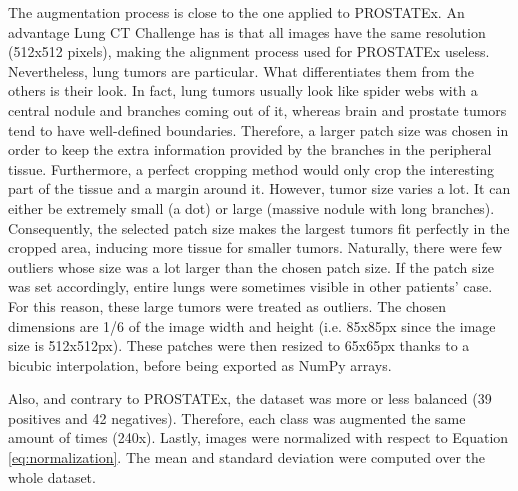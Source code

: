 The augmentation process is close to the one applied to PROSTATEx. An advantage Lung CT Challenge has is that all images have the same resolution (512x512 pixels), making the alignment process used for PROSTATEx useless. Nevertheless, lung tumors are particular. What differentiates them from the others is their look. In fact, lung tumors usually look like spider webs with a central nodule and branches coming out of it, whereas brain and prostate tumors tend to have well-defined boundaries. Therefore, a larger patch size was chosen in order to keep the extra information provided by the branches in the peripheral tissue. Furthermore, a perfect cropping method would only crop the interesting part of the tissue and a margin around it. However, tumor size varies a lot. It can either be extremely small (a dot) or large (massive nodule with long branches). Consequently, the selected patch size makes the largest tumors fit perfectly in the cropped area, inducing more tissue for smaller tumors. Naturally, there were few outliers whose size was a lot larger than the chosen patch size. If the patch size was set accordingly, entire lungs were sometimes visible in other patients' case. For this reason, these large tumors were treated as outliers. The chosen dimensions are 1/6 of the image width and height (i.e. 85x85px since the image size is 512x512px). These patches were then resized to 65x65px thanks to a bicubic interpolation, before being exported as NumPy arrays.

Also, and contrary to PROSTATEx, the dataset was more or less balanced (39 positives and 42 negatives). Therefore, each class was augmented the same amount of times (240x). Lastly, images were normalized with respect to Equation \ref{eq:normalization}. The mean and standard deviation were computed over the whole dataset. 


